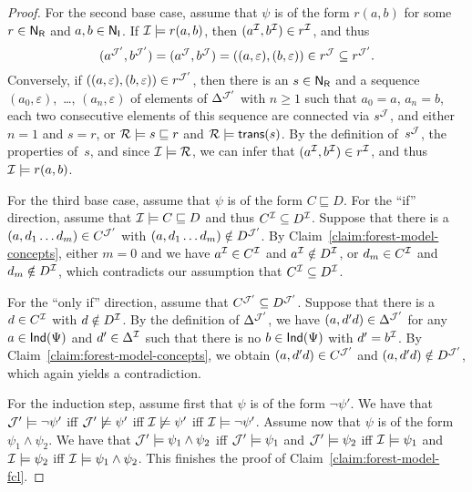 \begin{proof}
    For the second base case, assume that $\psi$ is of the form $r(a,b)$ for
    some $r\in\mathsf{N_R}$ and $a,b\in\mathsf{N_I}$.  If $\mathcal{I}\models r(a,b)$, then
    $(a^\mathcal{I},b^\mathcal{I})\in r^\mathcal{I}$, and thus
    \[(a^{\mathcal{J}'},b^{\mathcal{J}'})=(a^\mathcal{J},b^\mathcal{J})=((a,\varepsilon),(b,\varepsilon))\in
        r^\mathcal{J}\subseteq r^{\mathcal{J}'}.\]
    Conversely, if $((a,\varepsilon),(b,\varepsilon))\in r^{\mathcal{J}'}$, then there
    is an $s\in\mathsf{N_R}$ and a sequence $(a_0,\varepsilon)$,~\dots,
    $(a_n,\varepsilon)$ of elements of $\Delta^{\mathcal{J}'}$ with $n\ge 1$ such that
    $a_0=a$, $a_n=b$, each two consecutive elements of this sequence are
    connected via $s^\mathcal{J}$, and either $n=1$ and $s=r$, or $\mathcal{R}\models
    s\sqsubseteq r$ and $\mathcal{R}\models\mathsf{trans}(s)$.  By the definition of~$s^\mathcal{J}$,
    the properties of~$s$, and since $\mathcal{I}\models\mathcal{R}$, we can infer that
    $(a^\mathcal{I},b^\mathcal{I})\in r^\mathcal{I}$, and thus $\mathcal{I}\models r(a,b)$.

    For the third base case, assume that $\psi$ is of the form $C\sqsubseteq D$.
    For the \enquote{if} direction, assume that $\mathcal{I}\models C\sqsubseteq D$ and
    thus $C^\mathcal{I}\subseteq D^\mathcal{I}$.  Suppose that there is a $(a,d_1\dots d_m)\in
    C^{\mathcal{J}'}$ with $(a,d_1\dots d_m)\notin D^{\mathcal{J}'}$.  By
    Claim~\ref{claim:forest-model-concepts}, either $m=0$ and we have $a^\mathcal{I}\in
    C^\mathcal{I}$ and $a^\mathcal{I}\notin D^\mathcal{I}$, or $d_m\in C^\mathcal{I}$ and $d_m\notin
    D^\mathcal{I}$, which contradicts our assumption that $C^\mathcal{I}\subseteq D^\mathcal{I}$.

    For the \enquote{only if} direction, assume that $C^{\mathcal{J}'}\subseteq
    D^{\mathcal{J}'}$.  Suppose that there is a $d\in C^\mathcal{I}$ with $d\notin D^\mathcal{I}$.
    By the definition of $\Delta^{\mathcal{J}'}$, we have $(a,d'd)\in\Delta^{\mathcal{J}'}$
    for any $a\in\mathsf{Ind}(\Psi)$ and $d'\in\Delta^\mathcal{I}$ such that there is no
    $b\in\mathsf{Ind}(\Psi)$ with $d'=b^\mathcal{I}$.  By
    Claim~\ref{claim:forest-model-concepts}, we obtain $(a,d'd)\in C^{\mathcal{J}'}$
    and $(a,d'd)\notin D^{\mathcal{J}'}$, which again yields a contradiction.

    For the induction step, assume first that $\psi$ is of the form
    $\lnot\psi'$.  We have that $\mathcal{J}'\models\lnot\psi'$ iff
    $\mathcal{J}'\not\models\psi'$ iff $\mathcal{I}\not\models\psi'$ iff
    $\mathcal{I}\models\lnot\psi'$.
    Assume now that $\psi$ is of the form $\psi_1\land\psi_2$.  We have that
    $\mathcal{J}'\models\psi_1\land\psi_2$ iff $\mathcal{J}'\models\psi_1$ and
    $\mathcal{J}'\models\psi_2$ iff $\mathcal{I}\models\psi_1$ and $\mathcal{I}\models\psi_2$ iff
    $\mathcal{I}\models\psi_1\land\psi_2$.
    This finishes the proof of Claim~\ref{claim:forest-model-fcl}.


\end{proof}
